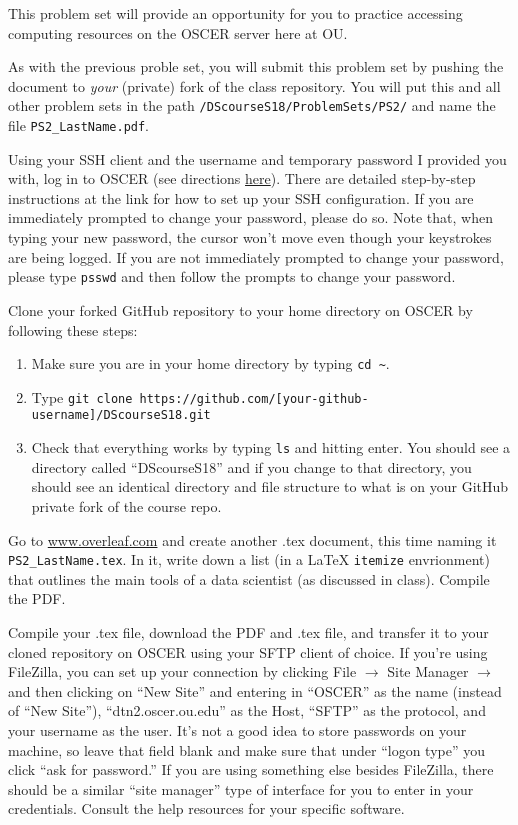 \documentclass[12pt,english]{exam}
\begin{document}
This problem set will provide an opportunity for you to practice accessing computing resources on the OSCER server here at OU.

As with the previous proble set, you will submit this problem set by pushing the document to \emph{your} (private) fork of the class repository. You will put this and all other problem sets in the path \texttt{/DScourseS18/ProblemSets/PS2/} and name the file \texttt{PS2\_LastName.pdf}.
\begin{questions}
\question Using your SSH client and the username and temporary password I provided you with, log in to OSCER (see directions \href{www.ou.edu/content/oscer/getting_started/getting_started_using_oscer.html}{here}). There are detailed step-by-step instructions at the link for how to set up your SSH configuration. If you are immediately prompted to change your password, please do so. Note that, when typing your new password, the cursor won't move even though your keystrokes are being logged. If you are not immediately prompted to change your password, please type \texttt{psswd} and then follow the prompts to change your password.

\question Clone your forked GitHub repository to your home directory on OSCER by following these steps:
\begin{enumerate}
	\item Make sure you are in your home directory by typing \texttt{cd \~}.
	\item Type \texttt{git clone https://github.com/[your-github-username]/DScourseS18.git}
	\item Check that everything works by typing \texttt{ls} and hitting enter. You should see a directory called ``DScourseS18'' and if you change to that directory, you should see an identical directory and file structure to what is on your GitHub private fork of the course repo.
\end{enumerate}

\question Go to \url{www.overleaf.com} and create another .tex document, this time naming it \texttt{PS2\_LastName.tex}. In it, write down a list (in a LaTeX \texttt{itemize} envrionment) that outlines the main tools of a data scientist (as discussed in class). Compile the PDF.

\question Compile your .tex file, download the PDF and .tex file, and transfer it to your cloned repository on OSCER using your SFTP client of choice. If you're using FileZilla, you can set up your connection by clicking File $\rightarrow$ Site Manager $\rightarrow$ and then clicking on ``New Site'' and entering in ``OSCER'' as the name (instead of ``New Site''), ``dtn2.oscer.ou.edu'' as the Host, ``SFTP'' as the protocol, and your username as the user. It's not a good idea to store passwords on your machine, so leave that field blank and make sure that under ``logon type'' you click ``ask for password.'' If you are using something else besides FileZilla, there should be a similar ``site manager'' type of interface for you to enter in your credentials. Consult the help resources for your specific software.


\end{questions}
\end{document}
